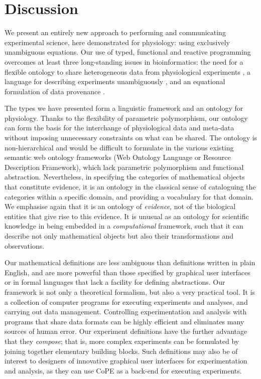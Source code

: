 \section*{Discussion}

We present an entirely new approach to performing and communicating
experimental science, here demonstrated for physiology: using
exclusively unambiguous equations.  Our use of typed, functional and
reactive programming overcomes at least three long-standing issues in
bioinformatics: the need for a flexible ontology to share
heterogeneous data from physiological experiments \cite{Amari2002}, a
language for describing experiments unambiguously
\cite{Murray-Rust2002}, and an equational formulation of data
provenance \cite{Pool2002}.

The types we have presented form a linguistic framework and an
ontology for physiology. Thanks to the flexibility of parametric polymorphism, our
ontology can form the basis for the interchange of physiological data
and meta-data without imposing unnecessary constraints on what can be
shared. The ontology is non-hierarchical and would be difficult to
formulate in the various existing semantic web ontology frameworks
(Web Ontology Language or Resource Description Framework), which lack
parametric polymorphism and functional abstraction. Nevertheless, in
specifying the categories of mathematical objects that constitute
evidence, it is an ontology in the classical sense of cataloguing the
categories within a specific domain, and providing a vocabulary for
that domain. We emphasise again that it is an ontology of
\emph{evidence}, not of the biological entities that give rise to this
evidence. It is unusual as an ontology for scientific knowledge in
being embedded in a \emph{computational} framework, such that it can
describe not only mathematical objects but also their transformations
and observations.

Our mathematical definitions are less ambiguous than definitions
written in plain English, and are more powerful than those specified
by graphical user interfaces or in formal languages that lack a
facility for defining abstractions. Our framework is not only a
theoretical formalism, but also a very practical tool. It is a
collection of computer programs for executing experiments and
analyses, and carrying out data management. Controlling
experimentation and analysis with programs that share data formats can
be highly efficient and eliminates many sources of human error. Our
experiment definitions have the further advantage that they
\emph{compose}; that is, more complex experiments can be formulated by
joining together elementary building blocks. Such definitions may also
be of interest to designers of innovative graphical user interfaces
for experimentation and analysis, as they can use CoPE as a back-end
for executing experiments.

